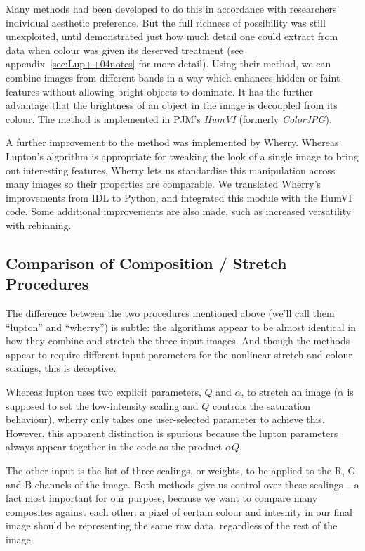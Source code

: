 \documentclass[letterpaper, 11pt]{article}
\begin{document}
Many methods had been developed to do this in accordance with researchers' individual aesthetic preference. But the full richness of possibility was still unexploited, until \citet{Lup++04} demonstrated just how much detail one could extract from data when colour was given its deserved treatment (see appendix~\ref{sec:Lup++04notes} for more detail). Using their method, we can combine images from different bands in a way which enhances hidden or faint features without allowing bright objects to dominate. It has the further advantage that the brightness of an object in the image is decoupled from its colour. The method is implemented in PJM's \emph{HumVI} (formerly \emph{ColorJPG}).

A further improvement to the method was implemented by Wherry. Whereas Lupton's algorithm is appropriate for tweaking the look of a single image to bring out interesting features, Wherry lets us standardise this manipulation across many images so their properties are comparable. We translated Wherry's improvements from IDL to Python, and integrated this module with the HumVI code. Some additional improvements are also made, such as increased versatility with rebinning.

\subsection{Comparison of Composition / Stretch Procedures}

The difference between the two procedures mentioned above (we'll call them ``lupton'' and ``wherry'') is subtle: the algorithms appear to be almost identical in how they combine and stretch the three input images. And though the methods appear to require different input parameters for the nonlinear stretch and colour scalings, this is deceptive.

Whereas lupton uses two explicit parameters, $Q$ and $\alpha$, to stretch an image ($\alpha$ is supposed to set the low-intensity scaling and $Q$ controls the saturation behaviour), wherry only takes one user-selected parameter to achieve this. However, this apparent distinction is spurious because the lupton parameters always appear together in the code as the product $\alpha Q$.

The other input is the list of three scalings, or weights, to be applied to the R, G and B channels of the image. Both methods give us control over these scalings -- a fact most important for our purpose, because we want to compare many composites against each other: a pixel of certain colour and intesnity in our final image should be representing the same raw data, regardless of the rest of the image.
\end{document}
